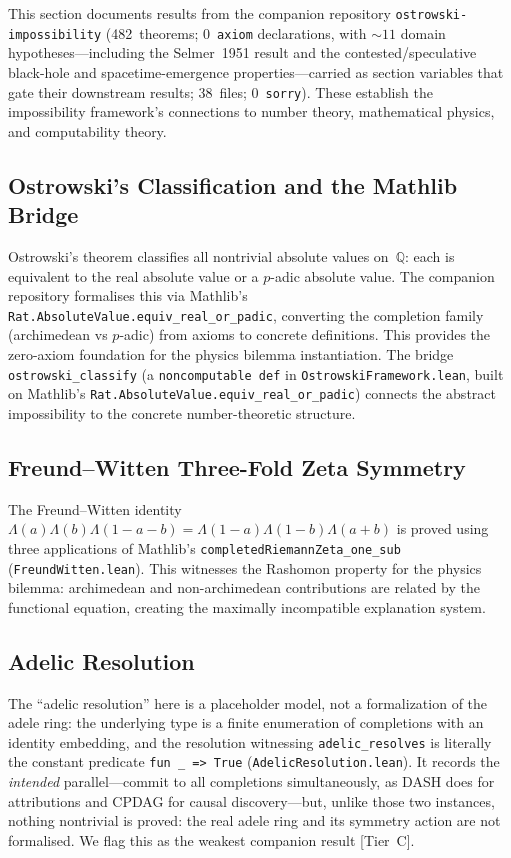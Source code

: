 \documentclass[11pt,a4paper]{article}
\begin{document}
This section documents results from the companion repository \texttt{ostrowski-impossibility} (482~theorems; 0~\texttt{axiom} declarations, with ${\sim}11$ domain hypotheses---including the Selmer~1951 result and the contested/speculative black-hole and spacetime-emergence properties---carried as section variables that gate their downstream results; 38~files; 0~\texttt{sorry}).  These establish the impossibility framework's connections to number theory, mathematical physics, and computability theory.

\subsection{Ostrowski's Classification and the Mathlib Bridge}

Ostrowski's theorem classifies all nontrivial absolute values on~$\mathbb{Q}$: each is equivalent to the real absolute value or a $p$-adic absolute value.  The companion repository formalises this via Mathlib's \texttt{Rat.AbsoluteValue.equiv\_real\_or\_padic}, converting the completion family (archimedean vs $p$-adic) from axioms to concrete definitions.  This provides the zero-axiom foundation for the physics bilemma instantiation.  The bridge \texttt{ostrowski\_classify} (a \texttt{noncomputable def} in \texttt{OstrowskiFramework.lean}, built on Mathlib's \texttt{Rat.AbsoluteValue.equiv\_real\_or\_padic}) connects the abstract impossibility to the concrete number-theoretic structure.

\subsection{Freund--Witten Three-Fold Zeta Symmetry}

The Freund--Witten identity
$\Lambda(a)\Lambda(b)\Lambda(1{-}a{-}b) = \Lambda(1{-}a)\Lambda(1{-}b)\Lambda(a{+}b)$
is proved using three applications of Mathlib's \texttt{completedRiemannZeta\_one\_sub} (\texttt{FreundWitten.lean}).  This witnesses the Rashomon property for the physics bilemma: archimedean and non-archimedean contributions are related by the functional equation, creating the maximally incompatible explanation system.

\subsection{Adelic Resolution}

The ``adelic resolution'' here is a placeholder model, not a formalization of the adele ring: the underlying type is a finite enumeration of completions with an identity embedding, and the resolution witnessing \texttt{adelic\_resolves} is literally the constant predicate \texttt{fun \_ => True} (\texttt{AdelicResolution.lean}).  It records the \emph{intended} parallel---commit to all completions simultaneously, as DASH does for attributions and CPDAG for causal discovery---but, unlike those two instances, nothing nontrivial is proved: the real adele ring and its symmetry action are not formalised.  We flag this as the weakest companion result [Tier~C].
\end{document}
